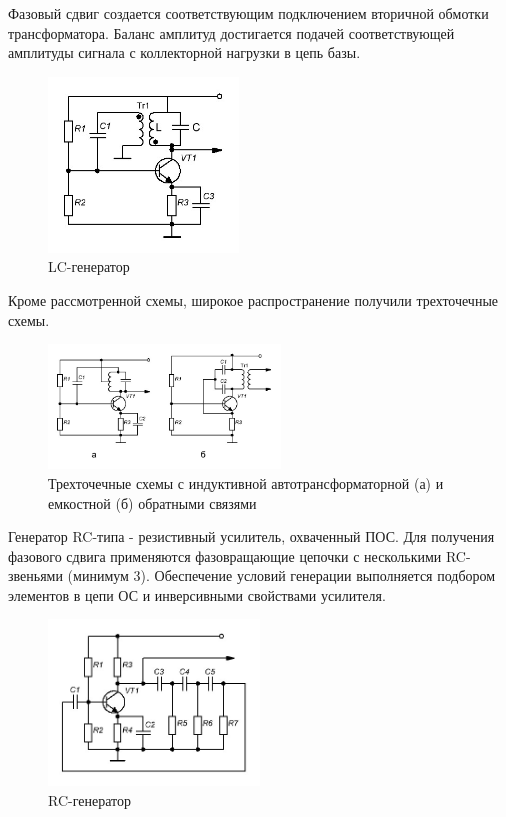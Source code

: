 \documentclass[unicode, 12pt, a4paper, oneside]{article}
\begin{document}
Фазовый сдвиг создается соответствующим подключением вторичной обмотки трансформатора. Баланс амплитуд достигается подачей соответствующей амплитуды сигнала с коллекторной нагрузки в цепь базы.

\begin{figure}[H]
\centering
\includegraphics[width=0.45\textwidth]{150_lc.jpg}
\caption{LC-генератор}
\end{figure}

Кроме рассмотренной схемы, широкое распространение получили трехточечные схемы.

\begin{figure}[H]
\centering
\includegraphics[width=0.55\textwidth]{150_3dot.jpg}
\caption{Трехточечные схемы с индуктивной автотрансформаторной (а) и емкостной (б) обратными связями}
\end{figure}

Генератор RC-типа - резистивный усилитель, охваченный ПОС. Для получения фазового сдвига применяются фазовращающие цепочки с несколькими RC-звеньями (минимум 3). Обеспечение условий генерации выполняется подбором элементов в цепи ОС и инверсивными свойствами усилителя.

\begin{figure}[H]
\centering
\includegraphics[width=0.5\textwidth]{150_rc.jpg}
\caption{RC-генератор}
\end{figure}
\end{document}
